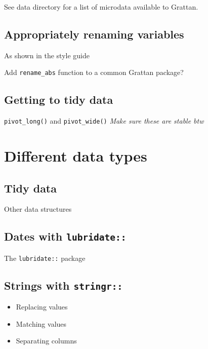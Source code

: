 \documentclass[
]{book}
\providecommand{\tightlist}{%
  \setlength{\itemsep}{0pt}\setlength{\parskip}{0pt}}
\begin{document}
See data directory for a list of microdata available to Grattan.

\hypertarget{appropriately-renaming-variables}{%
\section{Appropriately renaming variables}\label{appropriately-renaming-variables}}

As shown in the style guide

Add \texttt{rename\_abs} function to a common Grattan package?

\hypertarget{getting-to-tidy-data}{%
\section{Getting to tidy data}\label{getting-to-tidy-data}}

\texttt{pivot\_long()} and \texttt{pivot\_wide()}
\emph{Make sure these are stable btw}

\hypertarget{different-data-types}{%
\chapter{Different data types}\label{different-data-types}}

\hypertarget{tidy-data}{%
\section{Tidy data}\label{tidy-data}}

Other data structures

\hypertarget{dates-with-lubridate}{%
\section{\texorpdfstring{Dates with \texttt{lubridate::}}{Dates with lubridate::}}\label{dates-with-lubridate}}

The \texttt{lubridate::} package

\hypertarget{strings-with-stringr}{%
\section{\texorpdfstring{Strings with \texttt{stringr::}}{Strings with stringr::}}\label{strings-with-stringr}}

\begin{itemize}
\tightlist
\item
  Replacing values
\item
  Matching values
\item
  Separating columns
\end{itemize}
\end{document}
